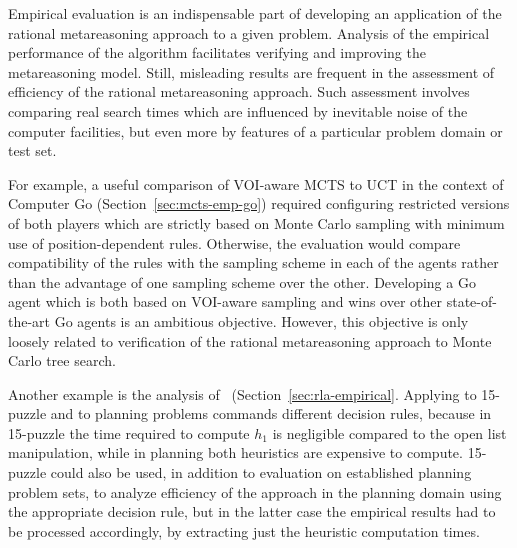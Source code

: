 Empirical evaluation is an indispensable part of developing an
application of the rational metareasoning approach to a given
problem. Analysis of the empirical performance of the algorithm
facilitates verifying and improving the metareasoning model.  Still,
misleading results are frequent in the assessment of efficiency of the
rational metareasoning approach. Such assessment involves comparing
real search times which are influenced by inevitable noise of the
computer facilities, but even more by features of a particular problem
domain or test set. 

For example, a useful comparison of VOI-aware MCTS
to UCT in the context of Computer Go (Section~\ref{sec:mcts-emp-go})
required configuring restricted versions of both players which are
strictly based on Monte Carlo sampling with minimum use of
position-dependent rules. Otherwise, the evaluation would compare
compatibility of the rules with the sampling scheme in each of the
agents rather than the advantage of one sampling scheme over the
other. Developing a Go agent which is both based on VOI-aware sampling
and wins over other state-of-the-art Go agents is an ambitious
objective. However, this objective is only loosely related to
verification of the rational metareasoning approach to Monte Carlo
tree search. 

Another example is the analysis of
\rationallazyastar~(Section~\ref{sec:rla-empirical}. Applying
\rationallazyastar to 15-puzzle and to planning problems commands
different decision rules, because in 15-puzzle the time required to
compute $h_1$ is negligible compared to the open list manipulation,
while in planning both heuristics are expensive to compute. 15-puzzle
could also be used, in addition to evaluation on established planning
problem sets, to analyze efficiency of the approach  in the
planning domain using the appropriate decision rule, but in the latter
case the empirical results had to be processed accordingly,
by extracting just the heuristic computation times. 
